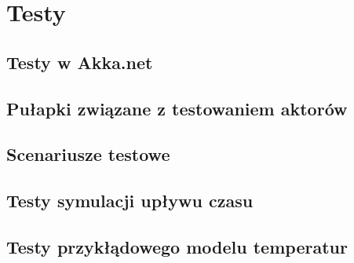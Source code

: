 \chapter{Testy}
\section{Testy w Akka.net}
\section{Pułapki związane z testowaniem aktorów}
\section{Scenariusze testowe}
\section{Testy symulacji upływu czasu}
\section{Testy przykłądowego modelu temperatur}